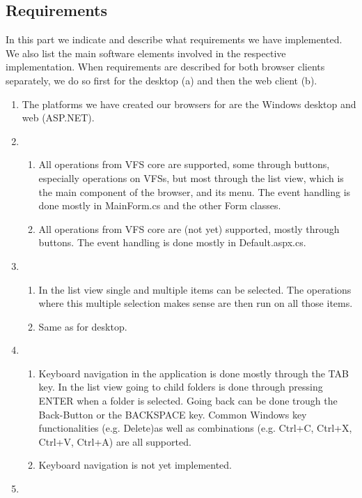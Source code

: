 \documentclass[a4paper,12pt]{article}
\begin{document}
\subsection{Requirements}
In this part we indicate and describe what requirements we have implemented. We also list the main software elements involved in the respective implementation. When requirements are described for both browser clients separately, we do so first for the desktop (a) and then the web client (b).

\begin{enumerate}
	\item The platforms we have created our browsers for are the Windows desktop and web (ASP.NET).
	\item
		\begin{enumerate} [label={(\alph*)}]
		\item All operations from VFS core are supported, some through buttons, especially operations on VFSs, but most through the list view, which is the main component of the browser, and its menu. The event handling is done mostly in MainForm.cs and the other Form classes.
		\item All operations from VFS core are (not yet) supported, mostly through buttons. The event handling is done mostly in Default.aspx.cs.
		\end{enumerate}
	\item
		\begin{enumerate} [label={(\alph*)}]
		\item In the list view single and multiple items can be selected. The operations where this multiple selection makes sense are then run on all those items.
		\item Same as for desktop.
		\end{enumerate}
	\item
		\begin{enumerate} [label={(\alph*)}]
		\item Keyboard navigation in the application is done mostly through the TAB key. In the list view going to child folders is done through pressing ENTER when a folder is selected. Going back can be done trough the Back-Button or the BACKSPACE key. Common Windows key functionalities (e.g. Delete)as well as combinations (e.g. Ctrl+C, Ctrl+X, Ctrl+V, Ctrl+A) are all supported.
		\item Keyboard navigation is not yet implemented.
		\end{enumerate}
	\item
		\begin{enumerate} [label={(\alph*)}]

\end{enumerate}
\end{enumerate}
\end{document}
